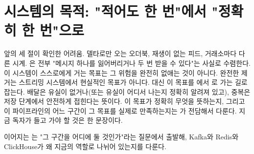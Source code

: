 \section{시스템의 목적: "적어도 한 번"에서 "정확히 한 번"으로}
\label{sec:problem-goal}

앞의 세 절이 확인한 어려움. 델타로만 오는 오더북, 재생이 없는 피드, 거래소마다
다른 시계. 은 전부 "메시지 하나를 잃어버리거나 두 번 받을 수 있다"는 사실로
수렴한다. 이 시스템이 스스로에게 거는 목표는 그 위험을 완전히 없애는 것이 아니다.
완전한 제거는 스트리밍 시스템에서 현실적인 목표가 아니다. 대신 이 목표를
에서 로 가는 길로 잡는다. 배달은 유실이 없거나(또는 유실이 어디서
나는지 정확히 알려져 있고), 중복은 저장 단계에서 안전하게 접힌다는 뜻이다. 이
목표가 정확히 무엇을 뜻하는지, 그리고 이 파이프라인의 어느 구간이 그 목표를
실제로 만족하는지는 가 전담해서 다룬다. 지금 독자가 들고 가야
할 것은 한 문장이다. 

이어지는 는 "그 구간을 어디에 둘 것인가"라는 질문에서 출발해,
Kafka와 Redis와 ClickHouse가 왜 지금의 역할로 나뉘어 있는지를 다룬다.
